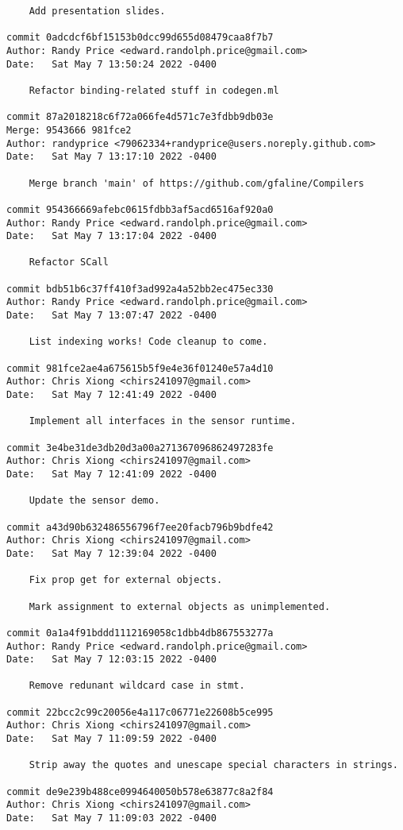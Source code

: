 {\begin{verbatim}
    Add presentation slides.

commit 0adcdcf6bf15153b0dcc99d655d08479caa8f7b7
Author: Randy Price <edward.randolph.price@gmail.com>
Date:   Sat May 7 13:50:24 2022 -0400

    Refactor binding-related stuff in codegen.ml

commit 87a2018218c6f72a066fe4d571c7e3fdbb9db03e
Merge: 9543666 981fce2
Author: randyprice <79062334+randyprice@users.noreply.github.com>
Date:   Sat May 7 13:17:10 2022 -0400

    Merge branch 'main' of https://github.com/gfaline/Compilers

commit 954366669afebc0615fdbb3af5acd6516af920a0
Author: Randy Price <edward.randolph.price@gmail.com>
Date:   Sat May 7 13:17:04 2022 -0400

    Refactor SCall

commit bdb51b6c37ff410f3ad992a4a52bb2ec475ec330
Author: Randy Price <edward.randolph.price@gmail.com>
Date:   Sat May 7 13:07:47 2022 -0400

    List indexing works! Code cleanup to come.

commit 981fce2ae4a675615b5f9e4e36f01240e57a4d10
Author: Chris Xiong <chirs241097@gmail.com>
Date:   Sat May 7 12:41:49 2022 -0400

    Implement all interfaces in the sensor runtime.

commit 3e4be31de3db20d3a00a271367096862497283fe
Author: Chris Xiong <chirs241097@gmail.com>
Date:   Sat May 7 12:41:09 2022 -0400

    Update the sensor demo.

commit a43d90b632486556796f7ee20facb796b9bdfe42
Author: Chris Xiong <chirs241097@gmail.com>
Date:   Sat May 7 12:39:04 2022 -0400

    Fix prop get for external objects.
    
    Mark assignment to external objects as unimplemented.

commit 0a1a4f91bddd1112169058c1dbb4db867553277a
Author: Randy Price <edward.randolph.price@gmail.com>
Date:   Sat May 7 12:03:15 2022 -0400

    Remove redunant wildcard case in stmt.

commit 22bcc2c99c20056e4a117c06771e22608b5ce995
Author: Chris Xiong <chirs241097@gmail.com>
Date:   Sat May 7 11:09:59 2022 -0400

    Strip away the quotes and unescape special characters in strings.

commit de9e239b488ce0994640050b578e63877c8a2f84
Author: Chris Xiong <chirs241097@gmail.com>
Date:   Sat May 7 11:09:03 2022 -0400


\end{verbatim}}
